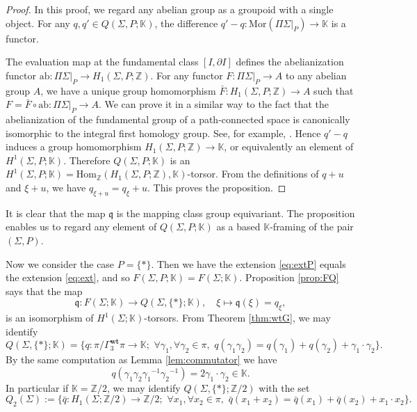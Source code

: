 \documentclass[a4paper,12pt, twoside]{amsart}
\theoremstyle{definition}
\theoremstyle{remark}
\numberwithin{equation}{section}
\newcommand\bK{{\mathbb{K}}}
\newcommand\bZ{{\mathbb{Z}}}
\newcommand\Gwt{\Gamma^{\mathbf{wt}}}
\newcommand\Hom{\mathrm{Hom}}
\newcommand\inv{^{-1}}
\newcommand\Mor{\mathrm{Mor}}
\newcommand\pa{\partial}
\begin{document}
\begin{proof} In this proof, we regard any abelian group as a groupoid with a single object. For any $q, q' \in Q(\Sigma, P; \bK)$, the difference $q'-q: \Mor(\Pi\Sigma\vert_P) \to \bK$ is a functor. \par
The evaluation map at the fundamental class 
$[I, \pa I]$ defines the abelianization functor $\mathrm{ab}: \Pi\Sigma\vert_P \to H_1(\Sigma, P; \bZ)$. For any functor $F: \Pi\Sigma\vert_P \to A$ to any abelian group $A$, we have a unique group homomorphism $\bar F: H_1(\Sigma, P; \bZ) \to A$ such that $F = \bar F\circ\mathrm{ab}: \Pi\Sigma\vert_P \to A$. We can prove it in a similar way to the fact that the abelianization of the fundamental group of a path-connected space is canonically isomorphic to the integral first homology group. 
See, for example, \cite[pp.166-167]{Hat02}. 
Hence $q'-q$ induces a group homomorphism $H_1(\Sigma, P; \bZ) \to \bK$, or equivalently an element of $H^1(\Sigma, P; \bK)$. 
Therefore $Q(\Sigma, P; \bK)$ is an $H^1(\Sigma, P; \bK) = \Hom_{\bZ}(H_1(\Sigma, P; \bZ), \bK)$-torsor. From the definitions of $q+u$ and $\xi+u$, we have $q_{\xi+u} = q_\xi + u$. This proves the proposition.
\end{proof}
It is clear that the map $\mathfrak{q}$ is the mapping class group equivariant.
The proposition enables us to regard any element of $Q(\Sigma, P; \bK)$ as a based $\bK$-framing of the pair $(\Sigma, P)$. 
\par
\bigskip
Now we consider the case $P = \{\ast\}$. 
Then we have the extension \eqref{eq:extP} equals the extension \eqref{eq:ext}, 
and so $F(\Sigma, P; \bK) = F(\Sigma; \bK)$. Proposition \ref{prop:FQ} says that 
the map 
$$
\mathfrak{q}: F(\Sigma; \bK) \to Q(\Sigma, \{\ast\}; \bK), \quad \xi \mapsto \mathfrak{q}(\xi) = q_\xi,
$$
is an isomorphism of $H^1(\Sigma; \bK)$-torsors. From Theorem \ref{thm:wtG}, we may identify
$$
Q(\Sigma, \{\ast\}; \bK) = \{q: \pi/\Gwt_3\pi \to \bK; \,\, \forall \gamma_1, \forall \gamma_2 \in \pi, \,\, q(\gamma_1\gamma_2) = q(\gamma_1) + q(\gamma_2) + \gamma_1\cdot\gamma_2\}.
$$
By the same computation as Lemma \ref{lem:commutator} we have
\begin{equation}\label{eq:commuator}
q(\gamma_1\gamma_2{\gamma_1}\inv{\gamma_2}\inv) = 2\gamma_1\cdot\gamma_2 
\in \bK.
\end{equation}
In particular if $\bK = \bZ/2$, we may identify $Q(\Sigma, \{\ast\}; \bZ/2)$ with the set 
$$
Q_2(\Sigma) := \{\bar q: H_1(\Sigma; \bZ/2) \to \bZ/2; \,\, \forall x_1, \forall x_2 \in \pi, \,\, \bar q(x_1 + x_2) = \bar q(x_1) + \bar q(x_2) + x_1\cdot x_2\}.
$$
\end{document}
